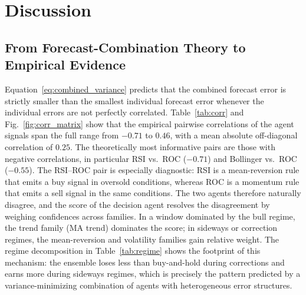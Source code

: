 \documentclass{ieeeaccess}
\newcommand{\CorrMeanAbs}{\ensuremath{0.25}}
\newcommand{\CorrMin}{\ensuremath{-0.71}}
\newcommand{\CorrMax}{\ensuremath{0.46}}
\begin{document}
\section{Discussion}
\label{sec:discussion}

\subsection{From Forecast-Combination Theory to Empirical Evidence}

Equation~\eqref{eq:combined_variance} predicts that the combined forecast error is strictly smaller than the smallest individual forecast error whenever the individual errors are not perfectly correlated. Table~\ref{tab:corr} and Fig.~\ref{fig:corr_matrix} show that the empirical pairwise correlations of the agent signals span the full range from $\CorrMin{}$ to $\CorrMax{}$, with a mean absolute off-diagonal correlation of $\CorrMeanAbs{}$. The theoretically most informative pairs are those with negative correlations, in particular RSI vs.\ ROC ($\CorrMin{}$) and Bollinger vs.\ ROC ($-0.55$). The RSI--ROC pair is especially diagnostic: RSI is a mean-reversion rule that emits a buy signal in oversold conditions, whereas ROC is a momentum rule that emits a sell signal in the same conditions. The two agents therefore naturally disagree, and the score of the decision agent resolves the disagreement by weighing confidences across families. In a window dominated by the bull regime, the trend family (MA trend) dominates the score; in sideways or correction regimes, the mean-reversion and volatility families gain relative weight. The regime decomposition in Table~\ref{tab:regime} shows the footprint of this mechanism: the ensemble loses less than buy-and-hold during corrections and earns more during sideways regimes, which is precisely the pattern predicted by a variance-minimizing combination of agents with heterogeneous error structures.
\end{document}
